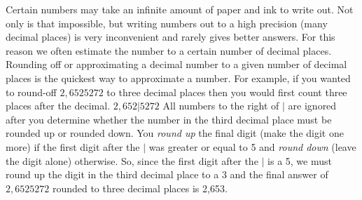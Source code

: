         
        \label{m30853*id63743}Certain numbers may take an infinite amount of paper and ink to write out. Not only is that impossible, but writing numbers out to a high precision (many decimal places) is very inconvenient and rarely gives better answers. For this reason we often estimate the number to a certain number of decimal places.
Rounding off or approximating a decimal number to a given number of decimal places is the quickest way to approximate a number. For example, if you wanted to round-off \begin{math}2,6525272\end{math} to three decimal places then you would first count three places after the decimal.
\begin{math}2,652|5272\end{math}
All numbers to the right of \begin{math}|\end{math} are ignored after you determine whether the number in the third decimal place must be rounded up or rounded down. You \textsl{round up} the final digit (make the digit one more) if the first digit after the \begin{math}|\end{math} was greater or equal to 5 and \textsl{round down} (leave the digit alone) otherwise.
So, since the first digit after the \begin{math}|\end{math} is a 5, we must round up the digit in the third decimal place to a 3 and the final answer of \begin{math}2,6525272\end{math} rounded to three decimal places is 2,653.\par 
\label{m30853*secfhsst!!!underscore!!!id320}\vspace{.5cm} 
      
